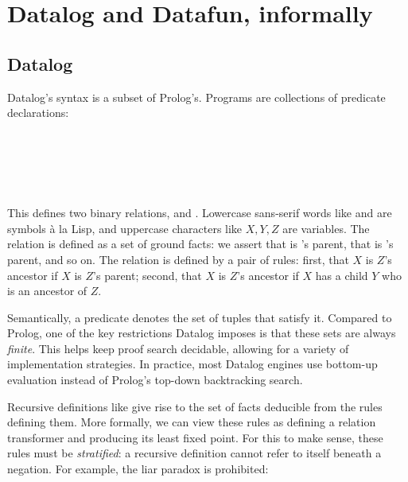 \newcommand\adjs{\kern-.3pts\kern.3pt}
\newcommand\adji{\kern-.5pti\kern.5pt}
\newcommand\adjj{\kern1pt j}

\section{Datalog and Datafun, informally}
\label{sec:datalog-and-datafun}

\subsection{Datalog}
\label{sec:datalog}

Datalog's syntax is a subset of Prolog's. Programs are collections of predicate
declarations:

\begin{code}
  \\
  \\
  \\[6pt]
   \gets {}\\
   \gets {} \wedge {}
\end{code}

\noindent
This defines two binary relations,  and . Lowercase
sans-serif words like  and  are symbols \`a la
Lisp, and uppercase characters like $X,Y,Z$ are variables.
%
The  relation is defined as a set of ground facts: we assert that
 is 's parent, that  is 's
parent, and so on. The  relation is defined by a pair of rules:
first, that $X$ is $Z$'s ancestor if $X$ is $Z$'s parent; second, that $X$ is
$Z$'s ancestor if $X$ has a child $Y$ who is an ancestor of $Z$.

Semantically, a predicate denotes the set of tuples that satisfy it. Compared to
Prolog, one of the key restrictions Datalog imposes is that these sets are
always \emph{finite}. This helps keep proof search decidable, allowing for a
variety of implementation strategies. In practice, most Datalog engines use
bottom-up evaluation instead of Prolog's top-down backtracking search.

Recursive definitions like  give rise to the set of facts
deducible from the rules defining them. More formally, we can view these rules
as defining a relation transformer and producing its least fixed point. For this
to make sense, these rules must be \emph{stratified}: a recursive definition
cannot refer to itself beneath a negation. For example, the liar paradox is
prohibited:

